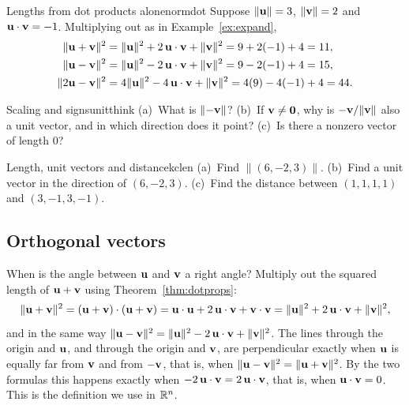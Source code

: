 \documentclass[11pt]{article}
\begin{document}
\begin{exmp}{Lengths from dot products alone}{normdot}
Suppose $\lVert\mathbf{u}\rVert=3$, $\lVert\mathbf{v}\rVert=2$ and $\mathbf{u}\cdot\mathbf{v}=-1$. Multiplying out as in Example~\ref{ex:expand},
\begin{align*}
\lVert\mathbf{u}+\mathbf{v}\rVert^2&=\lVert\mathbf{u}\rVert^2+2\,\mathbf{u}\cdot\mathbf{v}+\lVert\mathbf{v}\rVert^2=9+2(-1)+4=11,\\
\lVert\mathbf{u}-\mathbf{v}\rVert^2&=\lVert\mathbf{u}\rVert^2-2\,\mathbf{u}\cdot\mathbf{v}+\lVert\mathbf{v}\rVert^2=9-2(-1)+4=15,\\
\lVert2\mathbf{u}-\mathbf{v}\rVert^2&=4\lVert\mathbf{u}\rVert^2-4\,\mathbf{u}\cdot\mathbf{v}+\lVert\mathbf{v}\rVert^2=4(9)-4(-1)+4=44.
\end{align*}
\end{exmp}

\begin{think}{Scaling and signs}{unitthink}
(a)~What is $\lVert-\mathbf{v}\rVert$? (b)~If $\mathbf{v}\neq\mathbf{0}$, why is $-\mathbf{v}/\lVert\mathbf{v}\rVert$ also a unit vector, and in which direction does it point? (c)~Is there a nonzero vector of length $0$?
\end{think}

\begin{kc}{Length, unit vectors and distance}{kclen}
(a)~Find $\lVert(6,-2,3)\rVert$. (b)~Find a unit vector in the direction of $(6,-2,3)$. (c)~Find the distance between $(1,1,1,1)$ and $(3,-1,3,-1)$.
\end{kc}

\subsection*{Orthogonal vectors}

When is the angle between $\mathbf{u}$ and $\mathbf{v}$ a right angle? Multiply out the squared length of $\mathbf{u}+\mathbf{v}$ using Theorem~\ref{thm:dotprops}:
\begin{equation}\label{eq:sumsq}
\lVert\mathbf{u}+\mathbf{v}\rVert^2=(\mathbf{u}+\mathbf{v})\cdot(\mathbf{u}+\mathbf{v})=\mathbf{u}\cdot\mathbf{u}+2\,\mathbf{u}\cdot\mathbf{v}+\mathbf{v}\cdot\mathbf{v}=\lVert\mathbf{u}\rVert^2+2\,\mathbf{u}\cdot\mathbf{v}+\lVert\mathbf{v}\rVert^2,
\end{equation}
and in the same way $\lVert\mathbf{u}-\mathbf{v}\rVert^2=\lVert\mathbf{u}\rVert^2-2\,\mathbf{u}\cdot\mathbf{v}+\lVert\mathbf{v}\rVert^2$. The lines through the origin and $\mathbf{u}$, and through the origin and $\mathbf{v}$, are perpendicular exactly when $\mathbf{u}$ is equally far from $\mathbf{v}$ and from $-\mathbf{v}$, that is, when $\lVert\mathbf{u}-\mathbf{v}\rVert^2=\lVert\mathbf{u}+\mathbf{v}\rVert^2$. By the two formulas this happens exactly when $-2\,\mathbf{u}\cdot\mathbf{v}=2\,\mathbf{u}\cdot\mathbf{v}$, that is, when $\mathbf{u}\cdot\mathbf{v}=0$. This is the definition we use in $\mathbb{R}^n$.
\end{document}
